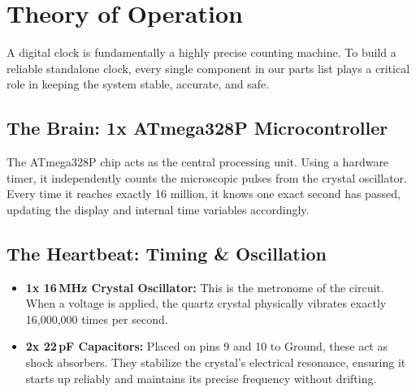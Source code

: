\documentclass[11pt,a4paper]{article}
\begin{document}
\begin{titlepage}
\end{titlepage}

\newpage
\tableofcontents
\newpage
\section{Theory of Operation}
A digital clock is fundamentally a highly precise counting machine. To build a reliable standalone clock, every single component in our parts list plays a critical role in keeping the system stable, accurate, and safe.

\subsection*{The Brain: 1x ATmega328P Microcontroller}
The ATmega328P chip acts as the central processing unit. Using a hardware timer, it independently counts the microscopic pulses from the crystal oscillator. Every time it reaches exactly 16 million, it knows one exact second has passed, updating the display and internal time variables accordingly.

\subsection*{The Heartbeat: Timing \& Oscillation}
\begin{itemize}
    \item \textbf{1x 16\,MHz Crystal Oscillator:} This is the metronome of the circuit. When a voltage is applied, the quartz crystal physically vibrates exactly 16,000,000 times per second. 
    \item \textbf{2x 22\,pF Capacitors:} Placed on pins 9 and 10 to Ground, these act as shock absorbers. They stabilize the crystal's electrical resonance, ensuring it starts up reliably and maintains its precise frequency without drifting.
\end{itemize}
\end{document}
